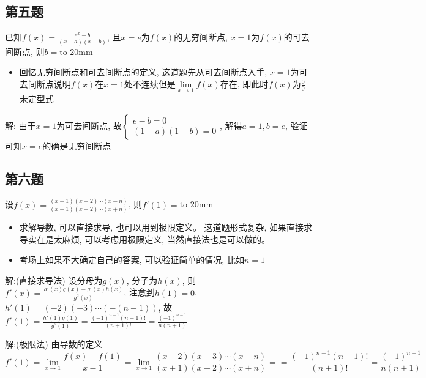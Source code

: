 \documentclass[10pt]{SelfArx} %
\numberwithin{dummy}{section}
\newenvironment{corollary}{\begin{cBox}\noindent{\bf\color{color1} 分析}}{\end{cBox}}
\begin{document}
\subsection{第五题}
已知$f(x)=\displaystyle\frac{e^x-b}{(x-a)(x-b)}$, 且$x=e$为$f(x)$的无穷间断点, $x=1$为$f(x)$的可去间断点, 则$b=$\underline{\hbox to 20mm{}}
\begin{corollary}
	\begin{itemize}
		\item 回忆无穷间断点和可去间断点的定义, 这道题先从可去间断点入手, $x=1$为可去间断点说明$f(x)$在$x=1$处不连续但是$\lim\limits_{x\to 1}f(x)$存在, 即此时$f(x)$为$\displaystyle\frac{0}{0}$未定型式
	\end{itemize}
\end{corollary}
解: 由于$x=1$为可去间断点, 故$\begin{cases}
e-b=0\\
(1-a)(1-b)=0
\end{cases}$, 解得$a=1,b=e$, 验证可知$x=e$的确是无穷间断点
\subsection{第六题}
设$f(x)=\displaystyle\frac{(x-1)(x-2)\cdots(x-n)}{(x+1)(x+2)\cdots(x+n)}$, 则$f'(1)=$\underline{\hbox to 20mm{}}
\begin{corollary}
	\begin{itemize}
		\item 求解导数, 可以直接求导, 也可以用到极限定义。 这道题形式复杂, 如果直接求导实在是太麻烦, 可以考虑用极限定义, 当然直接法也是可以做的。
		\item 考场上如果不大确定自己的答案, 可以验证简单的情况, 比如$n=1$
	\end{itemize}
\end{corollary}
解:(直接求导法)  设分母为$g(x)$, 分子为$h(x)$, 则$f'(x)=\displaystyle\frac{h'(x)g(x)-g'(x)h(x)}{g^2(x)}$, 注意到$h(1)=0$, $h'(1)=(-2)(-3)\cdots(-(n-1))$, 故$f'(1)=\displaystyle\frac{h'(1)g(1)}{g^2(1)}=\displaystyle\frac{(-1)^{n-1}(n-1)!}{(n+1)!}=\displaystyle\frac{(-1)^{n-1}}{n(n+1)}$

\indent

\noindent 解:(极限法) 由导数的定义
\begin{displaymath}
	f'(1)=\lim_{x\to 1}\displaystyle\frac{f(x)-f(1)}{x-1}=\lim_{x\to 1}\displaystyle\frac{(x-2)(x-3)\cdots(x-n)}{(x+1)(x+2)\cdots(x+n)}==\displaystyle\frac{(-1)^{n-1}(n-1)!}{(n+1)!}=\displaystyle\frac{(-1)^{n-1}}{n(n+1)}
\end{displaymath} 
\end{document}

